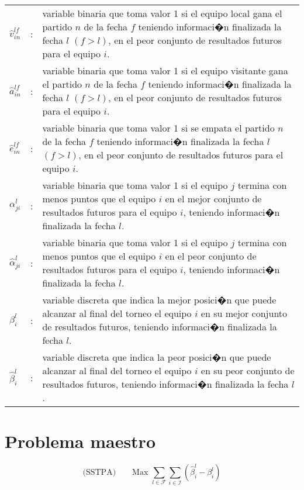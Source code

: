 \documentclass[authoryear,preprint,review,12pt]{elsarticle}
\begin{document}
\begin{tabular}{p{0.79cm}cp{13.5cm}}
$\hat{v}_{in}^{lf}$  & : & variable binaria que toma valor 1 si el equipo local gana el partido $n$ de la fecha $f$ teniendo informaci�n finalizada la fecha $l$ $(f > l)$, en el peor conjunto de resultados futuros para el equipo $i$.\\
$\hat{a}_{in}^{lf}$  & : & variable binaria que toma valor 1 si el equipo visitante gana el partido $n$ de la fecha $f$ teniendo informaci�n finalizada la fecha $l$ $(f > l)$, en el peor conjunto de resultados futuros para el equipo $i$.\\
$\hat{e}_{in}^{lf}$  & : & variable binaria que toma valor 1 si se empata el partido $n$ de la fecha $f$ teniendo informaci�n finalizada la fecha $l$ $(f > l)$, en el peor conjunto de resultados futuros para el equipo $i$.\\
$\alpha_{ji}^l$  & : & variable binaria que toma valor 1 si el equipo $j$ termina con menos puntos que el equipo $i$ en el mejor conjunto de resultados futuros para el equipo $i$, teniendo informaci�n finalizada la fecha $l$.\\
$\hat{\alpha}_{ji}^l$  & : & variable binaria que toma valor 1 si el equipo $j$ termina con menos puntos que el equipo $i$ en el peor conjunto de resultados futuros para el equipo $i$, teniendo informaci�n finalizada la fecha $l$.\\
$\beta_{i}^l$  & : & variable discreta que indica la mejor posici�n que puede alcanzar al final del torneo el equipo $i$ en su mejor conjunto de resultados futuros, teniendo informaci�n finalizada la fecha $l$.\\
$\hat{\beta}_{i}^l$  & : & variable discreta que indica la peor posici�n que puede alcanzar al final del torneo el equipo $i$ en su peor conjunto de resultados futuros, teniendo informaci�n finalizada la fecha $l$.\\
\end{tabular}


\newpage
\section{Problema maestro}
\begin{equation}\label{ecFO}
  \mbox{(SSTPA)}\qquad \text{Max } \sum_{l \in \mathcal{F}} \sum_{i \in \mathcal{I}}\left(\hat{\beta}_i^l - \beta_i^l\right)
\end{equation}
\end{document}
